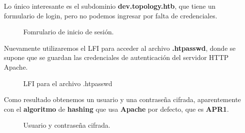 \documentclass[a4paper]{article} %
\begin{document}
    Lo único interesante es el subdominio \textbf{dev.topology.htb}, que tiene un formulario de login, pero no podemos ingresar por falta de credenciales.

    \begin{figure}[h] %
        \begin{center}
        \setlength{\fboxsep}{0.2em} %
        \end{center}
        \captionsetup{labelfont=bf} %
        \caption{Fomrulario de inicio de sesión.}
    \end{figure}

    \vspace{15cm}

    Nuevamente utilizaremos el LFI para acceder al archivo \textbf{.htpasswd}, donde se supone que se guardan las credenciales de autenticación del servidor HTTP Apache.

    \begin{figure}[h] %
        \begin{center}
        \setlength{\fboxsep}{0.2em} %
        \end{center}
        \captionsetup{labelfont=bf} %
        \caption{LFI para el archivo .htpasswd}
    \end{figure}

    \vspace{5cm}

    Como resultado obtenemos un usuario y una contraseña cifrada, aparentemente con el \textbf{algoritmo} de \textbf{hashing} que usa \textbf{Apache} por defecto, que es \textbf{APR1}.

    \begin{figure}[h] %
        \begin{center}
        \setlength{\fboxsep}{0.2em} %
        \end{center}
        \captionsetup{labelfont=bf} %
        \caption{Usuario y contraseña cifrada.}
    \end{figure}
\end{document}
